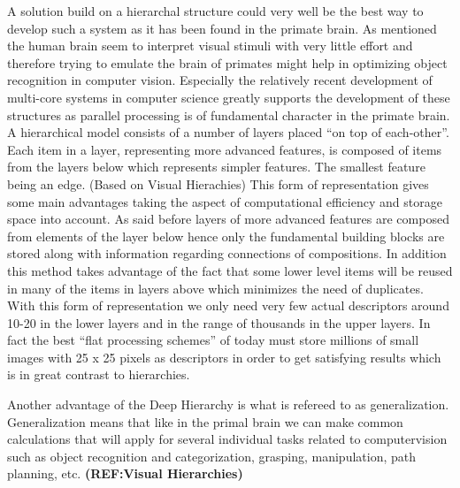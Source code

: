 A solution build on a hierarchal structure could very well be the best way to develop such a system as it has been found in the primate brain. As mentioned the human brain seem to interpret visual stimuli with very little effort and therefore trying to emulate the brain of primates might help in optimizing object recognition in computer vision. Especially the relatively recent development of multi-core systems in computer science greatly supports the development of these structures as parallel processing is of fundamental character in the primate brain.\citep{fidler2009learning}  \\
A hierarchical model consists of a number of layers placed “on top of each-other”. Each item in a layer, representing more advanced features, is composed of items from the layers below which represents simpler features. The smallest feature being an edge. 
(Based on Visual Hierachies)
This form of representation gives some main advantages taking the aspect of computational efficiency and storage space into account. As said before layers of more advanced features are composed from elements of the layer below hence only the fundamental building blocks are stored along with information regarding connections of compositions. In addition this method takes advantage of the fact that some lower level items will be reused in many of the items in layers above which minimizes the need of duplicates. With this form of representation we only need very few actual descriptors around 10-20 in the lower layers and in the range of thousands in the upper layers\citep{fidler2009learning}. 
In fact the best “flat processing schemes” of today must store millions of small images with 25 x 25 pixels as descriptors in order to get satisfying results which is in great contrast to hierarchies.\citep{fidler2009learning}

Another advantage of the Deep Hierarchy is what is refereed to as generalization. Generalization means that like in the primal brain we can make common calculations that will apply for several individual tasks related to computervision such as object recognition and categorization, grasping, manipulation, path planning, etc. \textbf{(REF:Visual Hierarchies)}